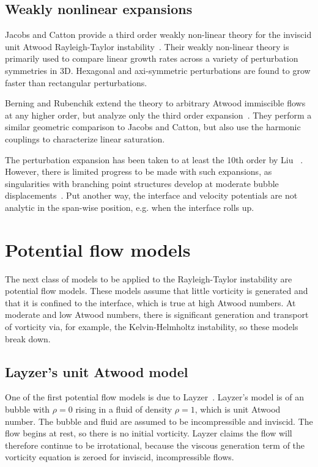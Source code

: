 \subsection{Weakly nonlinear expansions}
Jacobs and Catton provide a third order weakly non-linear theory for the inviscid unit Atwood Rayleigh-Taylor instability~\cite{Jacobs1988}.
Their weakly non-linear theory is primarily used to compare linear growth rates across a variety of perturbation symmetries in 3D.
Hexagonal and axi-symmetric perturbations are found to grow faster than rectangular perturbations.

Berning and Rubenchik extend the theory to arbitrary Atwood immiscible flows at any higher order, but analyze only the third order expansion~\cite{Berning1998}.
They perform a similar geometric comparison to Jacobs and Catton, but also use the harmonic couplings to characterize linear saturation.

The perturbation expansion has been taken to at least the 10th order by Liu \etal~\cite{Wang2010}.
However, there is limited progress to be made with such expansions, as singularities with branching point structures develop at moderate bubble displacements~\cite{Berning1998}.
Put another way, the interface and velocity potentials are not analytic in the span-wise position, e.g. when the interface rolls up.

\section{Potential flow models}

The next class of models to be applied to the Rayleigh-Taylor instability are potential flow models.
These models assume that little vorticity is generated and that it is confined to the interface, which is true at high Atwood numbers.
At moderate and low Atwood numbers, there is significant generation and transport of vorticity via, for example, the Kelvin-Helmholtz instability, so these models break down.

\subsection{Layzer's unit Atwood model}

One of the first potential flow models is due to Layzer~\cite{Layzer1955}.
Layzer's model is of an bubble with $\rho = 0$ rising in a fluid of density $\rho = 1$, which is unit Atwood number.
The bubble and fluid are assumed to be incompressible and inviscid.
The flow begins at rest, so there is no initial vorticity.
Layzer claims the flow will therefore continue to be irrotational, because the viscous generation term of the vorticity equation is zeroed for inviscid, incompressible flows.

